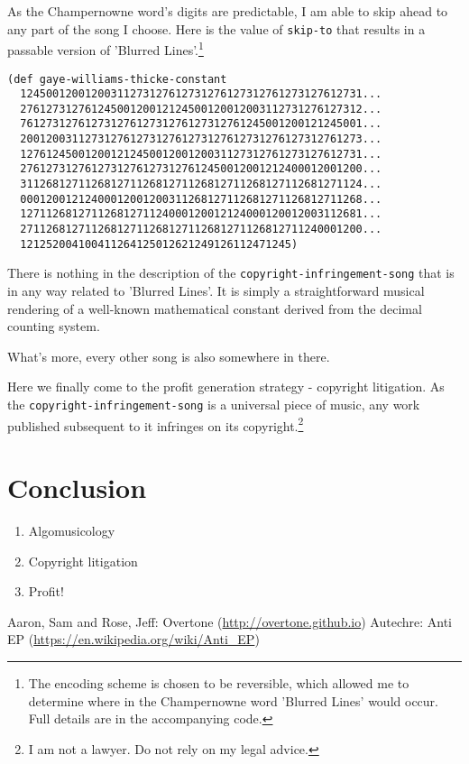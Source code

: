 \documentclass[numbers]{sigplanconf}
\begin{document}
As the Champernowne word's digits are predictable, I am able to skip ahead to any part of the song I choose. Here
is the value of \verb|skip-to| that results in a passable version of 'Blurred Lines'.\footnote{The encoding scheme is chosen
to be reversible, which allowed me to determine where in the Champernowne word 'Blurred Lines' would occur. Full details are in the accompanying code.}

\begin{verbatim}
(def gaye-williams-thicke-constant
  12450012001200311273127612731276127312761273127612731...
  27612731276124500120012124500120012003112731276127312...
  76127312761273127612731276127312761245001200121245001...
  20012003112731276127312761273127612731276127312761273...
  12761245001200121245001200120031127312761273127612731...
  27612731276127312761273127612450012001212400012001200...
  31126812711268127112681271126812711268127112681271124...
  00012001212400012001200311268127112681271126812711268...
  12711268127112681271124000120012124000120012003112681...
  27112681271126812711268127112681271126812711240001200...
  121252004100411264125012621249126112471245)
\end{verbatim}

There is nothing in the description of the \verb|copyright-infringement-song| that is in any way related to 'Blurred Lines'.
It is simply a straightforward musical rendering of a well-known mathematical constant derived from the decimal counting
system.

What's more, every other song is also somewhere in there.

Here we finally come to the profit generation strategy - copyright litigation. As the \verb|copyright-infringement-song| is
a universal piece of music, any work published subsequent to it infringes on its copyright.\footnote{I am not a lawyer. Do not rely on my legal advice.}

\section{Conclusion}

\begin{enumerate}
    \item Algomusicology
    \item Copyright litigation
    \item Profit!
\end{enumerate}




\begin{thebibliography}{}
\softraggedright

 Aaron, Sam and Rose, Jeff: Overtone (\url{http://overtone.github.io})
 Autechre: Anti EP (\url{https://en.wikipedia.org/wiki/Anti_EP})

\end{thebibliography}
\end{document}
